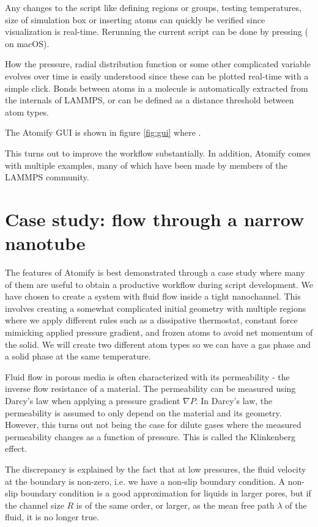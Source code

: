 \documentclass[12pt,a4paper,final]{iopart}
\begin{document}
Any changes to the script like defining regions or groups,
testing temperatures, size of simulation box or inserting atoms can
quickly be verified since visualization is real-time.
Rerunning the current script can be done by pressing  ( on macOS).

How the pressure, radial distribution function or some other
complicated variable evolves over time is easily understood
since these can be plotted real-time with a simple click.
Bonds between atoms in a molecule is automatically extracted from
the internals of LAMMPS, or can be defined as a distance threshold
between atom types.

The Atomify GUI is shown in figure \ref{fig:gui} where .

This turns out to improve the workflow substantially.
In addition, Atomify comes with multiple examples,
many of which have been made by members of the LAMMPS community.

\section{\label{sec:casestudy}Case study: flow through a narrow nanotube}
The features of Atomify is best demonstrated through a case study where many of
them are useful to obtain a productive workflow during script development.
We have chosen to create a system with fluid flow inside a tight nanochannel.
This involves creating a somewhat complicated initial geometry with multiple regions
where we apply different rules such as a dissipative thermostat, constant force mimicking
applied pressure gradient, and frozen atoms to avoid net momentum of the solid.
We will create two different atom types so we can have a gas phase and a solid phase at the same temperature.

Fluid flow in porous media is often characterized with its permeability - the inverse flow resistance of a material.
The permeability can be measured using Darcy's law when applying a pressure gradient $\nabla P$.
In Darcy's law, the permeability is assumed to only depend on the material and its geometry.
However, this turns out not being the case for dilute
gases where the measured permeability changes as a function of pressure\cite{klinkenberg1941permeability}.
This is called the Klinkenberg effect.

The discrepancy is explained by the fact that at low pressures, the fluid velocity
at the boundary is non-zero, i.e. we have a non-slip boundary condition.
A non-slip boundary condition is a good approximation for liquids in larger pores,
but if the channel size $R$ is of the same order,
or larger, as the mean free path $\lambda$ of the fluid, it is no longer true.
\end{document}
